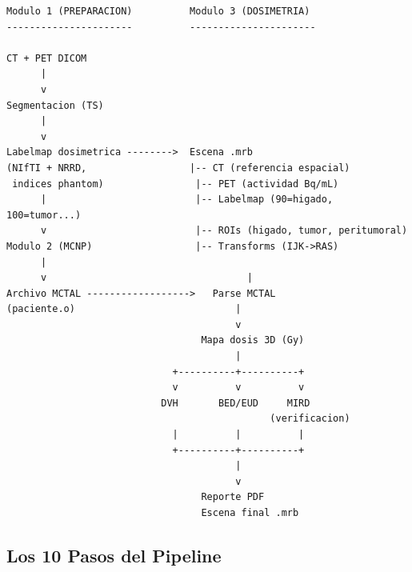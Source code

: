 \documentclass[12pt,a4paper]{article}
\begin{document}
\begin{lstlisting}
Modulo 1 (PREPARACION)          Modulo 3 (DOSIMETRIA)
----------------------          ----------------------

CT + PET DICOM
      |
      v
Segmentacion (TS)
      |
      v
Labelmap dosimetrica -------->  Escena .mrb
(NIfTI + NRRD,                  |-- CT (referencia espacial)
 indices phantom)                |-- PET (actividad Bq/mL)
      |                          |-- Labelmap (90=higado, 100=tumor...)
      v                          |-- ROIs (higado, tumor, peritumoral)
Modulo 2 (MCNP)                  |-- Transforms (IJK->RAS)
      |
      v                                   |
Archivo MCTAL ------------------>   Parse MCTAL
(paciente.o)                            |
                                        v
                                  Mapa dosis 3D (Gy)
                                        |
                             +----------+----------+
                             v          v          v
                           DVH       BED/EUD     MIRD
                                              (verificacion)
                             |          |          |
                             +----------+----------+
                                        |
                                        v
                                  Reporte PDF
                                  Escena final .mrb
\end{lstlisting}

\subsection{Los 10 Pasos del Pipeline}
\end{document}
